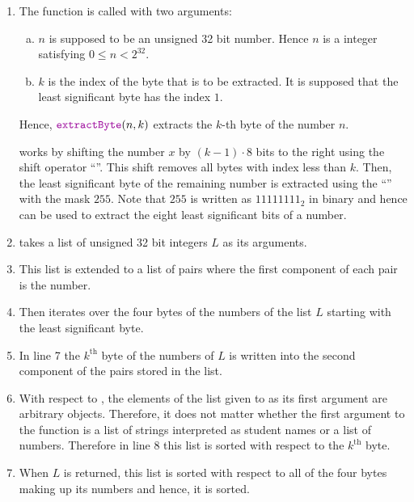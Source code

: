 \begin{enumerate}
\item The function  is called with two arguments:
      \begin{enumerate}[(a)]
      \item $n$ is supposed to be an unsigned 32 bit number.  Hence $n$ is a integer satisfying $0 \leq n < 2^{32}$.
      \item $k$ is the index of the byte that is to be extracted.  It is supposed that the least significant
            byte has the index $1$.
      \end{enumerate}
      Hence, $\mytt{extractByte}(n, k)$ extracts the $k$-th byte of the number $n$.

       works by shifting the number $x$ by $(k-1) \cdot 8$ bits to the right using the shift
      operator ``\mytt{>>}''.  This shift removes all bytes with index less than $k$. Then, the least significant
      byte of the remaining number is extracted using the   ``\mytt{\&}'' with the
      mask $255$.  Note that $255$ is written as $11111111_2$ in binary and hence can be used to extract the
      eight least significant bits of a number. 
\item {} takes a list of unsigned 32 bit integers $L$ as its arguments.
\item This list is extended to a list of pairs where the first component of each pair is the number.      
\item Then  iterates over the four bytes of the numbers of the list $L$ starting with the
      least significant byte.
\item In line 7 the $k^\mathrm{th}$ byte of the numbers of $L$ is written into the second component
      of the pairs stored in the list.      
\item With respect to ,  the elements of the list given to  as its
      first argument are 
      arbitrary objects.  Therefore, it does not matter whether the first argument to the function
       is a list of strings interpreted as student names or a list of numbers.
      Therefore in line 8 this list
      is sorted with respect to the $k^\mathrm{th}$ byte. 
\item When $L$ is returned, this list is sorted with respect to all of the four bytes making up its numbers and
      hence, it is sorted.
\end{enumerate}

